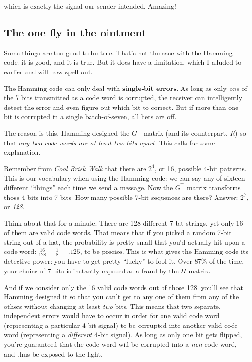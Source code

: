 \begin{alttitles}
which is exactly the signal our sender intended. Amazing!

\subsection{The one fly in the ointment}

Some things are too good to be true. That's not the case with the Hamming code:
it is good, and it is true. But it does have a limitation, which I alluded to
earlier and will now spell out.


The Hamming code can only deal with \textbf{single-bit errors}. As long as only
\textit{one} of the 7 bits transmitted as a code word is corrupted, the
receiver can intelligently detect the error and even figure out which bit to
correct. But if more than one bit is corrupted in a single batch-of-seven, all
bets are off.

The reason is this. Hamming designed the $G^\intercal$ matrix (and its
counterpart, $R$) so that \textit{any two code words are at least two bits
apart}. This calls for some explanation.

Remember from \textit{Cool Brisk Walk} that there are $2^{4}$, or 16, possible
4-bit patterns. This is our vocabulary when using the Hamming code: we can say
any of sixteen different ``things'' each time we send a message. Now the
$G^\intercal$ matrix transforms those 4 bits into 7 bits. How many possible
7-bit sequences are there? Answer: $2^7$, or \textit{128.}

Think about that for a minute. There are 128 different 7-bit strings, yet only
16 of them are valid code words. That means that if you picked a random 7-bit
string out of a hat, the probability is pretty small that you'd actually hit
upon a code word: $\frac{16}{128} = \frac{1}{8} = .125$, to be precise. This is
what gives the Hamming code its detective power: you have to get pretty
``lucky'' to fool it. Over $87\%$ of the time, your choice of 7-bits is
instantly exposed as a fraud by the $H$ matrix.

And if we consider only the 16 valid code words out of those 128, you'll see
that Hamming designed it so that you can't get to any one of them from any of
the others without changing at least \textit{two} bits. This means that two
separate, independent errors would have to occur in order for one valid code
word (representing a particular 4-bit signal) to be corrupted into another
valid code word (representing a \textit{different} 4-bit signal). As long as
only one bit gets flipped, you're guaranteed that the code word will be
corrupted into a \textit{non}-code word, and thus be exposed to the light.


\end{alttitles}
